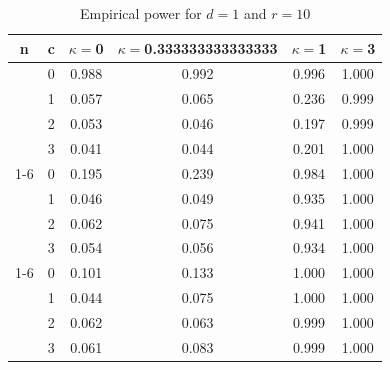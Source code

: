 \documentclass[oneside,11pt]{article}
\begin{document}
\begin{table}[H]
\centering
\caption{Empirical power for $d = 1$ and $r = 10$}
\centering
\begin{tabular}[t]{cccccc}
\toprule
n & c & $\kappa = $0 & $\kappa = $0.333333333333333 & $\kappa = $1 & $\kappa = $3\\
\midrule
 & 0 & 0.988 & 0.992 & 0.996 & 1.000\\

 & 1 & 0.057 & 0.065 & 0.236 & 0.999\\

 & 2 & 0.053 & 0.046 & 0.197 & 0.999\\

\multirow{-4}{*}{\centering\arraybackslash 10} & 3 & 0.041 & 0.044 & 0.201 & 1.000\\
\cmidrule{1-6}
 & 0 & 0.195 & 0.239 & 0.984 & 1.000\\

 & 1 & 0.046 & 0.049 & 0.935 & 1.000\\

 & 2 & 0.062 & 0.075 & 0.941 & 1.000\\

\multirow{-4}{*}{\centering\arraybackslash 50} & 3 & 0.054 & 0.056 & 0.934 & 1.000\\
\cmidrule{1-6}
 & 0 & 0.101 & 0.133 & 1.000 & 1.000\\

 & 1 & 0.044 & 0.075 & 1.000 & 1.000\\

 & 2 & 0.062 & 0.063 & 0.999 & 1.000\\

\multirow{-4}{*}{\centering\arraybackslash 100} & 3 & 0.061 & 0.083 & 0.999 & 1.000\\
\bottomrule
\end{tabular}
\end{table}
\end{document}
